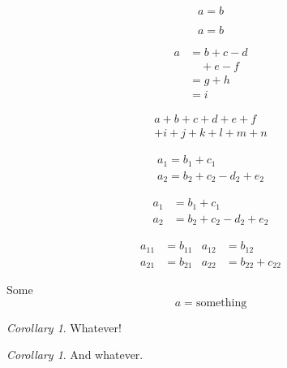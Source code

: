 \documentclass{amsart}
\theoremstyle{definition}
\theoremstyle{remark}
\newtheorem{corollary}{Corollary}
\newtheorem*{corollary*}{Corollary}
\numberwithin{equation}{section}
\begin{document}
\begin{equation*}
 a=b
\end{equation*}

\begin{equation}
 a=b
\end{equation}

\begin{equation}
\begin{split}
a &= b + c - d\\
  & \quad + e - f\\
  & = g + h\\
  & = i
\end{split}
\end{equation}

\begin{multline}
a+b+c+d+e+f\\
+i+j+k+l+m+n
\end{multline}

\begin{gather}
a_1=b_1+c_1 \\
a_2=b_2+c_2-d_2+e_2
\end{gather}

\begin{align}
a_1&=b_1+c_1 \\
a_2&=b_2+c_2-d_2+e_2
\end{align}

\begin{align}
a_{11} &= b_{11} &
  a_{12} &= b_{12} \\
a_{21} &= b_{21} &
  a_{22} &= b_{22}+c_{22}
\end{align}

Some 
\begin{equation}
a = \text{something}
\end{equation}

\begin{corollary}
 Whatever!
\end{corollary}
\begin{corollary*}
And whatever.
\end{corollary*}
\end{document}
